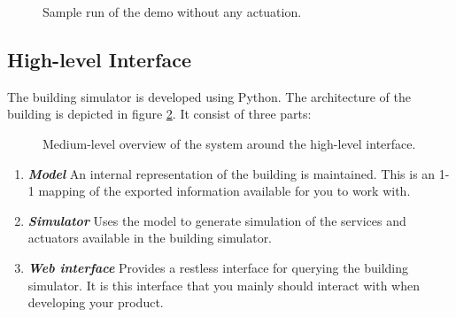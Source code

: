 \documentclass[10pt]{article}
\newcommand{\includeSVG}[1]{
  \texttt{[image: figs/\#1.pdf]}
}
\newcommand{\textdesc}[1]{\textit{\textbf{#1}}} %
\newcommand{\descitem}[1]{\item \textdesc{#1}}
\begin{document}
\begin{figure}[htb]
  \begin{center}
  \end{center}
  \caption{Sample run of the demo without any actuation.}
  \label{fig:demo}
\end{figure}

\subsection{High-level Interface}

The building simulator is developed using Python. The architecture of the building is depicted in
figure \ref{fig:interface:mediumlevel}. It consist of three parts:

\begin{figure}[htb]
  \begin{center}
    \rotatebox{0}{\scalebox{1.0}{\includeSVG{mediumleveloverview}}}
  \end{center}
  \caption{Medium-level overview of the system around the high-level interface.}
  \label{fig:interface:mediumlevel}
\end{figure}

\begin{enumerate}
				\descitem{Model} An internal representation of the building is maintained. This is
				an 1-1 mapping of the exported information available for you to work with.
				\descitem{Simulator} Uses the model to generate simulation of the services and
				actuators available in the building simulator.
				\descitem{Web interface} Provides a restless interface for querying the building
				simulator. It is this interface that you mainly should interact with when developing
				your product.
\end{enumerate}
\end{document}
